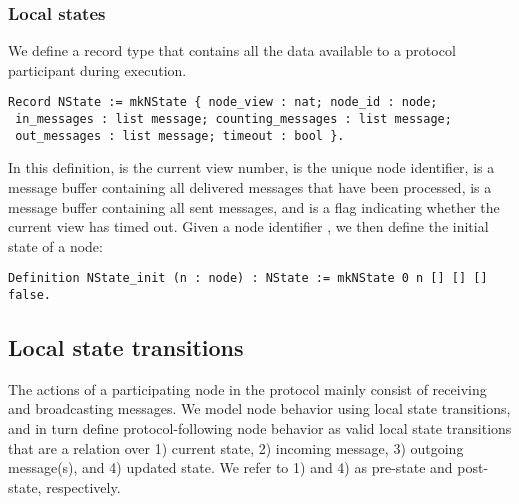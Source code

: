 \documentclass{easychair}
\begin{document}
\subsubsection{Local states}
We define a record type  that contains all the data available to a protocol participant during execution. 
\begin{lstlisting}[language=Coq]
Record NState := mkNState { node_view : nat; node_id : node; 
 in_messages : list message; counting_messages : list message; 
 out_messages : list message; timeout : bool }.
\end{lstlisting}
In this definition,  is the current view number,  is the unique node identifier,  is a message buffer containing all delivered messages that have been processed,  is a message buffer containing all sent messages, and  is a flag indicating whether the current view has timed out.
%
Given a node identifier , we then define the initial state of a node:
\begin{lstlisting}[language=Coq]
Definition NState_init (n : node) : NState := mkNState 0 n [] [] [] false.
\end{lstlisting}

\subsection{Local state transitions} 
The actions of a participating node in the protocol mainly consist of receiving and broadcasting messages. We model node behavior using local state transitions, and in turn define protocol-following node behavior as valid local state transitions that are a relation over 1) current state, 2) incoming message, 3) outgoing message(s), and 4) updated state. We refer to 1) and 4) as pre-state and post-state, respectively.
\end{document}
